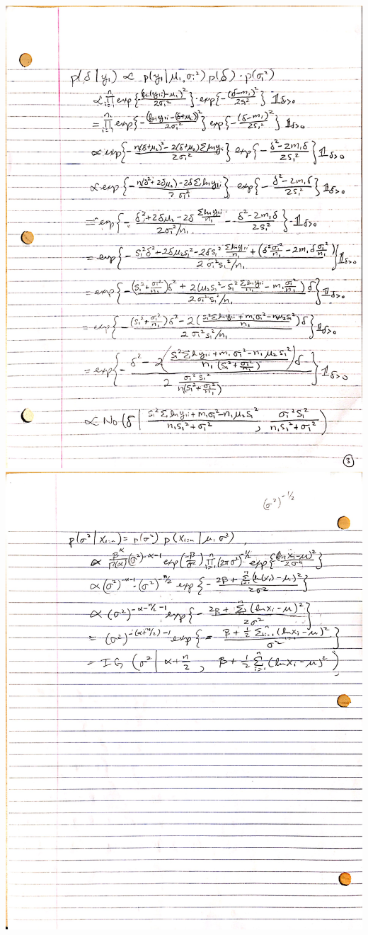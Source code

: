 \documentclass{article}
\begin{document}
\begin{enumerate}
\includegraphics[scale = 0.23]{page3.jpg}\\
\includegraphics[scale = 0.23]{page4.jpg}\\


\end{enumerate}
\end{document}
